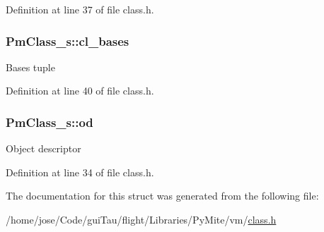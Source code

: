 Definition at line 37 of file class.\-h.

\hypertarget{struct_pm_class__s_abf165d7503bad49071ebf21a68e87ceb}{
\subsubsection[{cl\-\_\-bases}]{ Pm\-Class\-\_\-s\-::cl\-\_\-bases}}\label{struct_pm_class__s_abf165d7503bad49071ebf21a68e87ceb}
Bases tuple 

Definition at line 40 of file class.\-h.

\hypertarget{struct_pm_class__s_a2c97a1a85dfb00c7cb5acd413e2f0a8d}{
\subsubsection[{od}]{ Pm\-Class\-\_\-s\-::od}}\label{struct_pm_class__s_a2c97a1a85dfb00c7cb5acd413e2f0a8d}
Object descriptor 

Definition at line 34 of file class.\-h.



The documentation for this struct was generated from the following file\-:\begin{DoxyCompactItemize}
\item 
/home/jose/\-Code/gui\-Tau/flight/\-Libraries/\-Py\-Mite/vm/\hyperlink{class_8h}{class.\-h}\end{DoxyCompactItemize}
